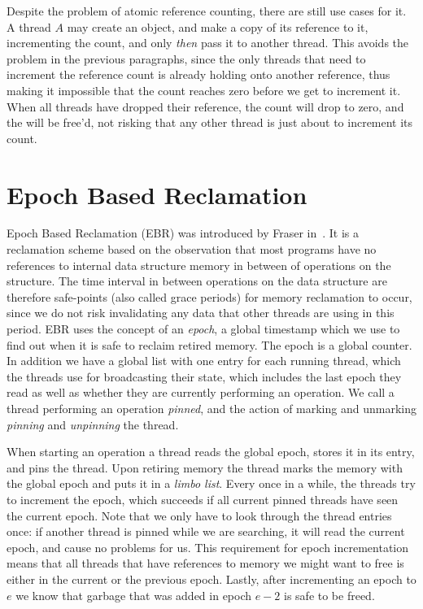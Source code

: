 \documentclass[b5paper]{report}
\begin{document}
Despite the problem of atomic reference counting, there are still use cases for
it. A thread $A$ may create an  object, and make a copy of its
reference to it, incrementing the count, and only \emph{then} pass it to another
thread. This avoids the problem in the previous paragraphs, since the only
threads that need to increment the reference count is already holding onto
another reference, thus making it impossible that the count reaches zero before
we get to increment it. When all threads have dropped their reference, the
count will drop to zero, and the  will be free'd, not risking that any
other thread is just about to increment its count.
\clearpage
\section{Epoch Based Reclamation\label{sec:ebr}}

Epoch Based Reclamation (EBR) was introduced by Fraser
in~\cite{fraser2004practical}. It is a reclamation scheme based on the
observation that most programs have no references to internal data structure
memory in between of operations on the structure. The time interval in between
operations on the data structure are therefore safe-points (also called grace
periods) for memory reclamation to occur, since we do not risk invalidating any
data that other threads are using in this period. EBR uses the concept of an
\emph{epoch}, a global timestamp which we use to find out when it is safe to
reclaim retired memory. The epoch is a global counter. In addition we have a
global list with one entry for each running thread, which the threads use for
broadcasting their state, which includes the last epoch they read as well as
whether they are currently performing an operation. We call a thread performing
an operation \emph{pinned}, and the action of marking and unmarking
\emph{pinning} and \emph{unpinning} the thread.

When starting an operation a thread reads the global epoch, stores it in its
entry, and pins the thread. Upon retiring memory the thread marks the memory
with the global epoch and puts it in a \emph{limbo list}. Every once in a while,
the threads try to increment the epoch, which succeeds if all current pinned
threads have seen the current epoch. Note that we only have to look through the
thread entries once: if another thread is pinned while we are searching, it will
read the current epoch, and cause no problems for us. This requirement for
epoch incrementation means that all threads that have references to memory we
might want to free is either in the current or the previous epoch. Lastly, after
incrementing an epoch to $e$ we know that garbage that was added in epoch $e-2$
is safe to be freed.
\end{document}
